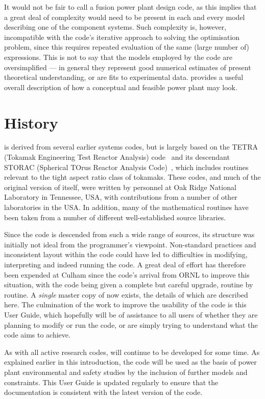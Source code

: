 It would not be fair to call \PS a fusion power plant design code, as this
implies that a great deal of complexity would need to be present in each and
every model describing one of the component systems. Such complexity is,
however, incompatible with the code's iterative approach to solving the
optimisation problem, since this requires repeated evaluation of the same
(large number of) expressions. This is not to say that the models employed by
the code are oversimplified --- in general they represent good numerical
estimates of present theoretical understanding, or are fits to experimental
data. \PS provides a useful overall description of how a conceptual and
feasible power plant may look.

\section{History}

\PS is derived from several earlier systems codes, but is largely based on the
TETRA (Tokamak Engineering Test Reactor Analysis) code~\cite{tetra} and its
descendant STORAC (Spherical TOrus Reactor Analysis Code)~\cite{storac}, which
includes routines relevant to the tight aspect ratio class of tokamaks. These
codes, and much of the original version of \PS itself, were written by
personnel at Oak Ridge National Laboratory in Tennessee, USA, with
contributions from a number of other laboratories in the USA\@. In addition,
many of the mathematical routines have been taken from a number of different
well-established source libraries.

Since the code is descended from such a wide range of sources, its structure
was initially not ideal from the programmer's viewpoint.  Non-standard
practices and inconsistent layout within the code could have led to
difficulties in modifying, interpreting and indeed running the code. A great
deal of effort has therefore been expended at Culham since the code's arrival
from ORNL to improve this situation, with the code being given a complete but
careful upgrade, routine by routine. A {\em single}\/ master copy of \PS now
exists, the details of which are described here. The culmination of the work
to improve the usability of the code is this User Guide, which hopefully will
be of assistance to all users of \PSC whether they are planning to modify or
run the code, or are simply trying to understand what the code aims to
achieve.

As with all active research codes, \PS will continue to be developed for some
time. As explained earlier in this introduction, the code will be used as the
basis of power plant environmental and safety studies by the inclusion of
further models and constraints. This User Guide is updated regularly to ensure
that the documentation is consistent with the latest version of the code.

